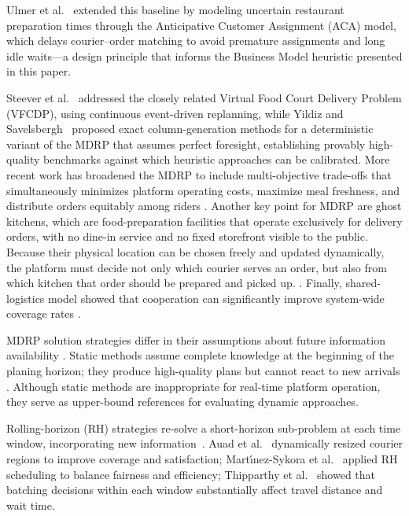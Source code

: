 \documentclass[runningheads]{llncs}
\begin{document}
 Ulmer et al.~\cite{ref-ulmer2021} extended this baseline by
modeling uncertain restaurant preparation times through the
Anticipative Customer Assignment (ACA) model, which delays
courier--order matching to avoid premature assignments and long idle waits—a design principle that informs the Business Model heuristic presented in this paper.

Steever et al.~\cite{ref-steever2019} addressed the closely
related Virtual Food Court Delivery Problem (VFCDP), using
continuous event-driven replanning, while Yildiz and Savelsbergh~\cite{ref-yildiz2019} proposed exact column-generation methods for a deterministic variant of the MDRP
that assumes perfect foresight, establishing provably high-quality benchmarks against which heuristic approaches can be calibrated.
More recent work has broadened the MDRP to include multi-objective trade-offs that simultaneously minimizes platform operating costs, maximize meal freshness, and distribute orders equitably among riders \cite{ref-dusadeerungsikul2023}. Another key point for MDRP are ghost kitchens, which are food-preparation facilities that operate exclusively for delivery orders, with no dine-in service and no fixed
storefront visible to the public. Because their physical location can be chosen freely and updated dynamically, the platform must decide not only which courier serves an order, but also from which kitchen that order should be prepared and picked up. \cite{ref-neria2024}. Finally, shared-logistics model showed that cooperation can significantly improve system-wide coverage rates \cite{ref-bi2023}.



MDRP solution strategies differ in their assumptions about future
information availability \cite{ref-reyes2018}. Static methods assume complete knowledge at the beginning of the planing horizon; they produce high-quality plans but cannot react
to new arrivals \cite{ref-martinez2024,ref-yildiz2019}. Although static methods are inappropriate for real-time platform operation, they serve as upper-bound references for evaluating dynamic approaches.



Rolling-horizon (RH) strategies re-solve a short-horizon
sub-problem at each time window, incorporating new
information~\cite{ref-martinez2024,ref-bajec2022,ref-xue2021,ref-thipparthy2024}. Auad et al.~\cite{ref-auad2023} dynamically resized courier regions to improve coverage and satisfaction; Mart\'{\i}nez-Sykora et al.~\cite{ref-martinez2024} applied RH
scheduling to balance fairness and efficiency; Thipparthy et al.~\cite{ref-thipparthy2024} showed that
batching decisions within each window substantially affect travel
distance and wait time.
\end{document}

